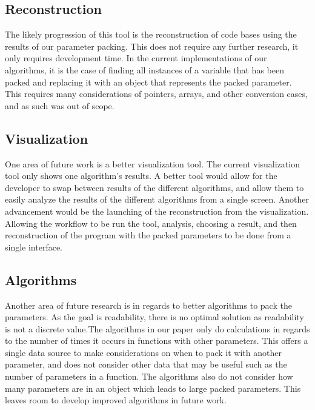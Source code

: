 \documentclass{article}
\begin{document}
\subsection{Reconstruction}
The likely progression of this tool is the reconstruction of code bases using the results of our parameter packing. This does not require any further research, it only requires development time. In the current implementations of our algorithms, it is the case of finding all instances of a variable that has been packed and replacing it with an object that represents the packed parameter. This requires many considerations of pointers, arrays, and other conversion cases, and as such was out of scope. 
\subsection{Visualization}
One area of future work is a better visualization tool. The current visualization tool only shows one algorithm's results. A better tool would allow for the developer to swap between results of the different algorithms, and allow them to easily analyze the results of the different algorithms from a single screen. Another advancement would be the launching of the reconstruction from the visualization. Allowing the workflow to be run the tool, analysis, choosing a result, and then reconstruction of the program with the packed parameters to be done from a single interface.
\subsection{Algorithms}
Another area of future research is in regards to better algorithms to pack the parameters. As the goal is readability, there is no optimal solution as readability is not a discrete value.The algorithms in our paper only do calculations in regards to the number of times it occurs in functions with other parameters. This offers a single data source to make considerations on when to pack it with another parameter, and does not consider other data that may be useful such as the number of parameters in a function. The algorithms also do not consider how many parameters are in an object which leads to large packed parameters. This leaves room to develop improved algorithms in future work. 



\end{document}
